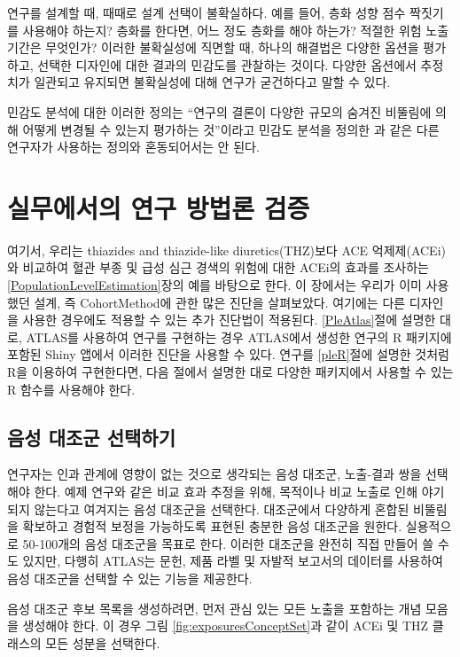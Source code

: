 \documentclass[10.5pt]{book}
\theoremstyle{definition}
\theoremstyle{definition}
\theoremstyle{definition}
\theoremstyle{remark}
\begin{document}
연구를 설계할 때, 때때로 설계 선택이 불확실하다. 예를 들어, 층화 성향
점수 짝짓기를 사용해야 하는지? 층화를 한다면, 어느 정도 층화를 해야
하는가? 적절한 위험 노출 기간은 무엇인가? 이러한 불확실성에 직면할 때,
하나의 해결법은 다양한 옵션을 평가하고, 선택한 디자인에 대한 결과의
민감도를 관찰하는 것이다. 다양한 옵션에서 추정치가 일관되고 유지되면
불확실성에 대해 연구가 굳건하다고 말할 수 있다.

민감도 분석에 대한 이러한 정의는 ``연구의 결론이 다양한 규모의 숨겨진
비뚤림에 의해 어떻게 변경될 수 있는지 평가하는 것''이라고 민감도 분석을
정의한 \citet{rosenbaum_2005} 과 같은 다른 연구자가 사용하는 정의와
혼동되어서는 안 된다.

\section{실무에서의 연구 방법론 검증}\label{---}

여기서, 우리는 thiazides and thiazide-like diuretics(THZ)보다 ACE
억제제(ACEi)와 비교하여 혈관 부종 및 급성 심근 경색의 위험에 대한 ACEi의
효과를 조사하는 \ref{PopulationLevelEstimation}장의 예를 바탕으로 한다.
이 장에서는 우리가 이미 사용했던 설계, 즉 CohortMethod에 관한 많은
진단을 살펴보았다. 여기에는 다른 디자인을 사용한 경우에도 적용할 수 있는
추가 진단법이 적용된다. \ref{PleAtlas}절에 설명한 대로, ATLAS를 사용하여
연구를 구현하는 경우 ATLAS에서 생성한 연구의 R 패키지에 포함된 Shiny
앱에서 이러한 진단을 사용할 수 있다. 연구를 \ref{pleR}절에 설명한 것처럼
R을 이용하여 구현한다면, 다음 절에서 설명한 대로 다양한 패키지에서
사용할 수 있는 R 함수를 사용해야 한다.

\subsection{음성 대조군 선택하기}\label{--}

연구자는 인과 관계에 영향이 없는 것으로 생각되는 음성 대조군, 노출-결과
쌍을 선택해야 한다. 예제 연구와 같은 비교 효과 추정을 위해, 목적이나
비교 노출로 인해 야기되지 않는다고 여겨지는 음성 대조군을 선택한다.
대조군에서 다양하게 혼합된 비뚤림을 확보하고 경험적 보정을 가능하도록
표현된 충분한 음성 대조군을 원한다. 실용적으로 50-100개의 음성 대조군을
목표로 한다. 이러한 대조군을 완전히 직접 만들어 쓸 수도 있지만, 다행히
ATLAS는 문헌, 제품 라벨 및 자발적 보고서의 데이터를 사용하여 음성
대조군을 선택할 수 있는 기능을 제공한다.

음성 대조군 후보 목록을 생성하려면, 먼저 관심 있는 모든 노출을 포함하는
개념 모음을 생성해야 한다. 이 경우 그림 \ref{fig:exposuresConceptSet}과
같이 ACEi 및 THZ 클래스의 모든 성분을 선택한다.
\end{document}
